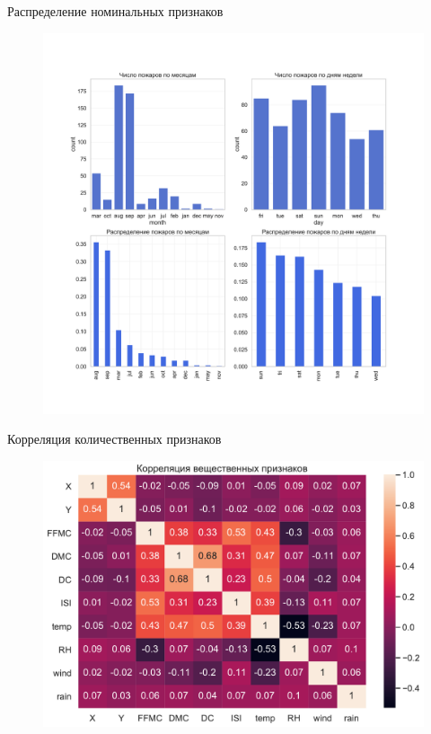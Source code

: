 \documentclass{beamer} %
\begin{document}
    \begin{frame}{Распределение номинальных признаков}
        \begin{figure}[h!]
            \centering
            \includegraphics[scale = 0.2]{cat_features.pdf}
        \end{figure}
    \end{frame}

    \begin{frame}{Корреляция количественных признаков}
        \begin{figure}[h!]
            \centering
            \includegraphics[scale = 0.35]{num_features_corr.pdf}
        \end{figure}
    \end{frame}
\end{document}
